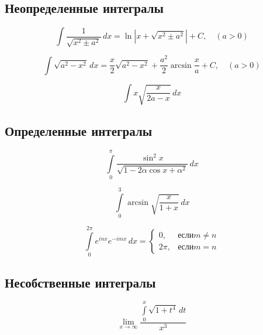 \documentclass[a4paper,14pt]{article}
\begin{document}
\subsection{Неопределенные интегралы}

\setcounter{equation}{0}

\begin{equation}
\int \frac{1}{\sqrt{x^2\pm a^2}} \, dx = \ln{|x+\sqrt{x^2 \pm a^2}|}+ C,  \quad (a>0)
\end{equation}

\begin{equation}
\int \sqrt{a^2-x^2} \, dx = \frac{x}{2}\sqrt{a^2-x^2}+ \frac{a^2}{2}\arcsin \frac{x}{a} +C, \quad (a>0)
\end{equation}

\setcounter{equation}{1782}

\begin{equation}
\int x\sqrt{\frac{x}{2a-x}} \, dx
\end{equation}

\subsection{Определенные интегралы}

\setcounter{equation}{2237}

\begin{equation}
\int\limits_{0}^{\pi} \frac{\sin^2 x}{\sqrt{1-2\alpha\cos x +\alpha^2}} \,dx
\end{equation}

\setcounter{equation}{2273}
\begin{equation}
\int\limits_{0}^{3} \arcsin \sqrt{\frac{x}{1+x}} \,dx
\end{equation}

\setcounter{equation}{2283}
\begin{equation}
\int\limits_{0}^{2\pi} e^{inx}e^{-imx} \,dx = 
\begin{cases}
0, &  если m \ne n \\ 
2\pi, & если m = n
\end{cases}
\end{equation}

\setcounter{equation}{2356}

\subsection{Несобственные интегралы}
\begin{equation}
\lim_{x \to \infty} \dfrac{\int\limits_{0}^{x} \sqrt{1+t^4} \,dt}{x^3}
\end{equation}
\end{document}
